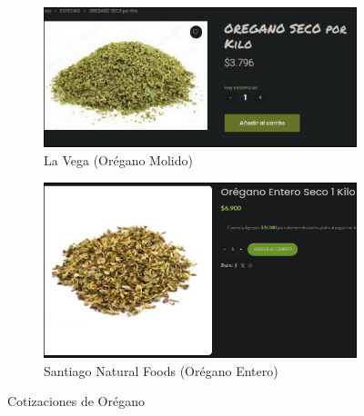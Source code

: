 \documentclass[12pt]{article}
\begin{document}
    \begin{figure}[H]
        \centering
        \begin{subfigure}{0.48\textwidth}
            \centering
            \includegraphics[width=\linewidth]{vega} %
            \caption{La Vega (Orégano Molido)}
            \label{fig:la_vega_oregano}
        \end{subfigure}
        \hfill
        \begin{subfigure}{0.48\textwidth}
            \centering
            \includegraphics[width=\linewidth]{Oregano} %
            \caption{Santiago Natural Foods (Orégano Entero)}
            \label{fig:santiago_natural_foods_oregano}
        \end{subfigure}
        \caption{Cotizaciones de Orégano}
        \label{fig:cotizaciones_oregano}
    \end{figure}
\newpage
\end{document}
